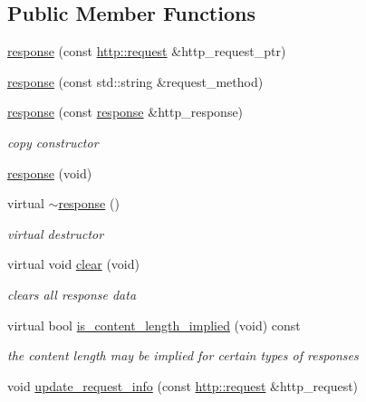 \subsection*{Public Member Functions}
\begin{DoxyCompactItemize}
\item 
\hyperlink{classpion_1_1http_1_1response_af459c78b24147ae4bd1bea8c2da2d294}{response} (const \hyperlink{classpion_1_1http_1_1request}{http\-::request} \&http\-\_\-request\-\_\-ptr)
\item 
\hyperlink{classpion_1_1http_1_1response_a18b0b58e5ae3a7d885745907e0ac9cd6}{response} (const std\-::string \&request\-\_\-method)
\item 
\hyperlink{classpion_1_1http_1_1response_aa6d18e376129813e953d7b100a82e199}{response} (const \hyperlink{classpion_1_1http_1_1response}{response} \&http\-\_\-response)
\begin{DoxyCompactList}\small\item\em copy constructor \end{DoxyCompactList}\item 
\hyperlink{classpion_1_1http_1_1response_a05a0b5ff4bd220b250b887ce148a6bbc}{response} (void)
\item 
virtual \hyperlink{classpion_1_1http_1_1response_a9802a656f1dc6c0a9ecc706c06167dc6}{$\sim$response} ()
\begin{DoxyCompactList}\small\item\em virtual destructor \end{DoxyCompactList}\item 
virtual void \hyperlink{classpion_1_1http_1_1response_a0713749f7a9ac79b6e04a753e7332e83}{clear} (void)
\begin{DoxyCompactList}\small\item\em clears all response data \end{DoxyCompactList}\item 
virtual bool \hyperlink{classpion_1_1http_1_1response_ad9e7b85bac1ad8f69145ccc719efd3da}{is\-\_\-content\-\_\-length\-\_\-implied} (void) const 
\begin{DoxyCompactList}\small\item\em the content length may be implied for certain types of responses \end{DoxyCompactList}\item 
void \hyperlink{classpion_1_1http_1_1response_a6a2428e8d529db703e14260fab28f887}{update\-\_\-request\-\_\-info} (const \hyperlink{classpion_1_1http_1_1request}{http\-::request} \&http\-\_\-request)

\end{DoxyCompactItemize}
